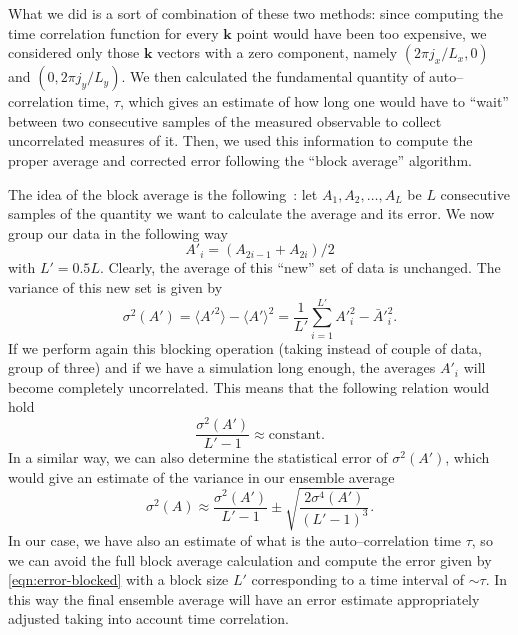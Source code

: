 What we did is a sort of combination of these two methods: since computing the time correlation function for every $\bm{k}$ point would have been too expensive, we considered only those $\bm{k}$ vectors with a zero component, namely $(2\pi j_x/L_x,0)$ and $(0,2\pi j_y/L_y)$. We then calculated the fundamental quantity of auto--correlation time, $\tau$, which gives an estimate of how long one would have to ``wait'' between two consecutive samples of the measured observable to collect uncorrelated measures of it. Then, we used this information to compute the proper average and corrected error following the ``block average'' algorithm.

The idea of the block average is the following~\cite{Flyvbjerg1989}: let $A_1,A_2,\dots,A_L$ be $L$ consecutive samples of the quantity we want to calculate the average and its error. We now group our data in the following way
\begin{equation}
    A'_i= (A_{2i-1}+A_{2i})/2
\end{equation}
with $L'=0.5 L$. Clearly, the average of this ``new'' set of data is unchanged. The variance of this new set is given by
\begin{equation}
    \sigma^2(A')=\langle A'^2 \rangle - \langle A'\rangle^2=\frac{1}{L'}\sum_{i=1}^{L'} A'^2_i-\bar{A}'^2_i.
\end{equation}
If we perform again this blocking operation (taking instead of couple of data, group of three) and if we have a simulation long enough, the averages $A'_i$ will become completely uncorrelated. This means that the following relation would hold
\begin{equation}
    \frac{\sigma^2(A')}{L'-1}\approx \text{constant}.
\end{equation}
In a similar way, we can also determine the statistical error of $\sigma^2(A')$, which would give an estimate of the variance in our ensemble average
\begin{equation}
\label{eqn:error-blocked}
    \sigma^2(A) \approx \frac{\sigma^2(A')}{L'-1} \pm \sqrt{\frac{2\sigma^4(A')}{(L'-1)^3}}.
\end{equation}
In our case, we have also an estimate of what is the auto--correlation time $\tau$, so we can avoid the full block average calculation and compute the error given by \cref{eqn:error-blocked} with a block size $L'$ corresponding to a time interval of $\sim \tau$. In this way the final ensemble average will have an error estimate appropriately adjusted taking into account time correlation.

